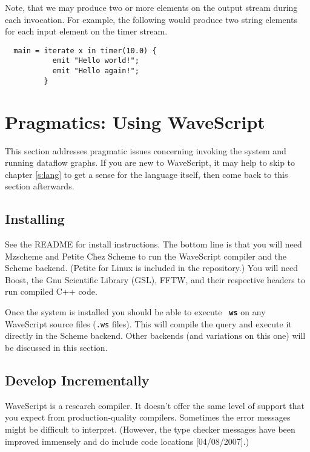 \documentclass[twocolumn]{report}
\newcommand{\ws}{WaveScript}
\begin{document}
Note, that we may produce two or more elements on the output stream
during each invocation.  For example, the following would produce two
string elements for each input element on the timer stream.
\begin{verbatim}
  main = iterate x in timer(10.0) {
           emit "Hello world!";
           emit "Hello again!";
         }
\end{verbatim}


\section{Pragmatics: Using WaveScript}


This section addresses pragmatic issues concerning invoking
the system and running dataflow graphs.  If you are new to WaveScript,
it may help to skip to chapter \ref{s:lang} to get a sense for the
language itself, then come back to this section afterwards.

\subsection*{Installing}

See the README for install instructions.  The bottom line is that you
will need Mzscheme and Petite Chez Scheme to run the WaveScript
compiler and the Scheme backend.  (Petite for Linux is included in the
repository.)  You will need Boost, the Gnu Scientific Library (GSL),
FFTW, and their respective headers to run compiled C++ code.

Once the system is installed you should be able to execute {\bf \tt
  ws} on any WaveScript source files ({\tt .ws} files).  This will
compile the query and execute it directly in the Scheme backend.
Other backends (and variations on this one) will be discussed in this
section.  

\subsection*{Develop Incrementally}

WaveScript is a research compiler.  It doesn't offer the same
level of support that you expect from production-quality
compilers.  Sometimes the error messages might be difficult to
interpret.  (However, the type checker messages have been improved
immensely and do include code locations [04/08/2007].)
\end{document}
